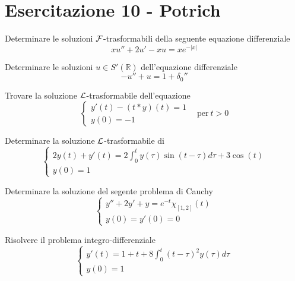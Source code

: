 \chapter{Esercitazione 10 - Potrich}
\ParteEsercizi
\Esercizio{}

Determinare le soluzioni $\displaystyle \mathcal{F} $-trasformabili della seguente equazione differenziale
\begin{equation*}
xu''+2u'-xu=xe^{-| x| }
\end{equation*}
\Esercizio{}

Determinare le soluzioni $\displaystyle u\in S'(\mathbb{R})$ dell'equazione differenziale
\begin{equation*}
-u''+u=1+\delta _{0} ''
\end{equation*}
\Esercizio{}

Trovare la soluzione $\mathcal{L}$-trasformabile dell'equazione
\begin{equation*}
\begin{cases}
y'( t) -( t*y)( t) =1\\
y( 0) =-1
\end{cases} \ \ \ \ \text{per} \ t >0
\end{equation*}
\Esercizio{}

Determinare la soluzione $\mathcal{L}$-trasformabile di
\begin{equation*}
\begin{cases}
2y( t) +y'( t) =2\int ^{t}_{0} y( \tau )\sin( t-\tau ) d\tau +3\cos( t)\\
y( 0) =1
\end{cases}
\end{equation*}
\Esercizio{}

Determinare la soluzione del segente problema di Cauchy
\begin{equation*}
\begin{cases}
y''+2y'+y=e^{-t} \chi _{[ 1,2]}( t)\\
y( 0) =y'( 0) =0
\end{cases}
\end{equation*}
\Esercizio{}

Risolvere il problema integro-differenziale
\begin{equation*}
\begin{cases}
y'( t) =1+t+8\int ^{t}_{0}( t-\tau )^{2} y( \tau ) d\tau \\
y( 0) =1
\end{cases}
\end{equation*}
\ParteSoluzioni
\Soluzione

